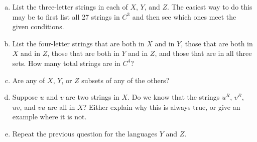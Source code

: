 \documentclass[12pt]{article}
\begin{document}
\begin{enumerate}[(a)]
    \item List the three-letter strings in each of $X$, $Y$, and $Z$. The easiest way to do this may be to first list all 27 strings in $C^3$ and then see which ones meet the given conditions.

    \item List the four-letter strings that are both in $X$ and in $Y$, those that are both in $X$ and in $Z$, those that are both in $Y$ and in $Z$, and those that are in all three sets. How many total strings are in $C^4$?

    \item Are any of $X$, $Y$, or $Z$ subsets of any of the others?

    \item Suppose $u$ and $v$ are two strings in $X$. Do we know that the strings $u^R$, $v^R$, $uv$, and $vu$ are all in $X$? Either explain why this is always true, or give an example where it is not.

    \item Repeat the previous question for the languages $Y$ and $Z$.

\end{enumerate}
\end{document}

